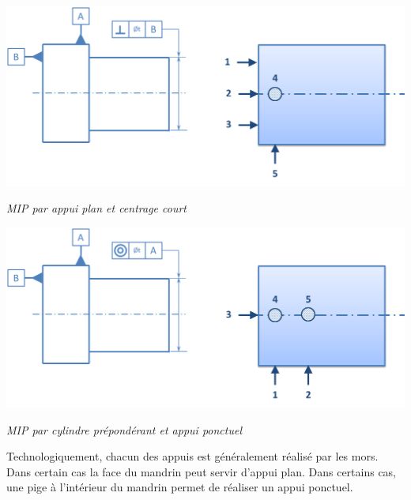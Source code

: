 \documentclass[11pt,oneside]{article}
\begin{document}
\begin{minipage}[c]{.48\linewidth}
\begin{center}
\includegraphics[width=\textwidth]{png/MIP_2}

\textit{MIP par appui plan et centrage court}
\end{center}
\end{minipage}\hfill
\begin{minipage}[c]{.48\linewidth}
\begin{center}
\includegraphics[width=\textwidth]{png/MIP_1}

\textit{MIP par cylindre prépondérant et appui ponctuel}
\end{center}
\end{minipage}

Technologiquement, chacun des appuis est généralement réalisé par les mors. Dans certain cas la face du mandrin peut servir d'appui plan. Dans certains cas, une pige à l'intérieur du mandrin permet de réaliser un appui ponctuel.
\end{document}
